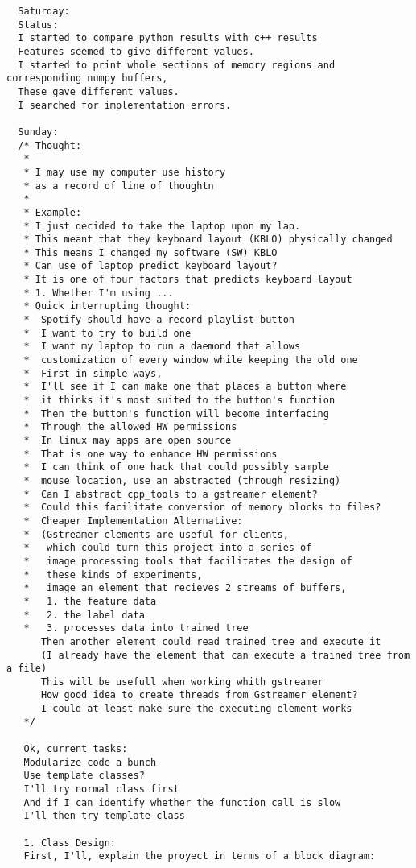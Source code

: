 \documentclass[12pt,oneside]{book}
\begin{document}
\begin{lstlisting}
  Saturday:
  Status:
  I started to compare python results with c++ results
  Features seemed to give different values.
  I started to print whole sections of memory regions and corresponding numpy buffers,
  These gave different values.
  I searched for implementation errors.

  Sunday:
  /* Thought:
   *
   * I may use my computer use history
   * as a record of line of thoughtn
   * 
   * Example:
   * I just decided to take the laptop upon my lap.
   * This meant that they keyboard layout (KBLO) physically changed
   * This means I changed my software (SW) KBLO
   * Can use of laptop predict keyboard layout?
   * It is one of four factors that predicts keyboard layout
   * 1. Whether I'm using ...
   * Quick interrupting thought:
   *  Spotify should have a record playlist button
   *  I want to try to build one
   *  I want my laptop to run a daemond that allows
   *  customization of every window while keeping the old one
   *  First in simple ways,
   *  I'll see if I can make one that places a button where
   *  it thinks it's most suited to the button's function
   *  Then the button's function will become interfacing
   *  Through the allowed HW permissions
   *  In linux may apps are open source
   *  That is one way to enhance HW permissions
   *  I can think of one hack that could possibly sample
   *  mouse location, use an abstracted (through resizing)
   *  Can I abstract cpp_tools to a gstreamer element?
   *  Could this facilitate conversion of memory blocks to files?
   *  Cheaper Implementation Alternative:
   *  (Gstreamer elements are useful for clients,
   *   which could turn this project into a series of
   *   image processing tools that facilitates the design of
   *   these kinds of experiments,
   *   image an element that recieves 2 streams of buffers,
   *   1. the feature data
   *   2. the label data
   *   3. processes data into trained tree
      Then another element could read trained tree and execute it
      (I already have the element that can execute a trained tree from a file)
      This will be usefull when working whith gstreamer
      How good idea to create threads from Gstreamer element?
      I could at least make sure the executing element works
   */

   Ok, current tasks:
   Modularize code a bunch
   Use template classes?
   I'll try normal class first
   And if I can identify whether the function call is slow
   I'll then try template class
   
   1. Class Design:
   First, I'll, explain the proyect in terms of a block diagram:


\end{lstlisting}
\end{document}
